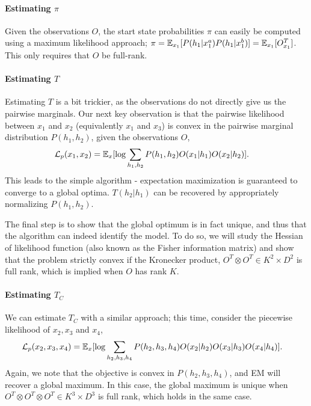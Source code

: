 \paragraph{Estimating $\pi$}

Given the observations $O$, the start state probabilities $\pi$ can
  easily be computed using a maximum likelihood approach; $\pi =
  \mathbb{E}_{x_1}[P(h_1|x^a_1) P(h_1|x^b_1)] = \mathbb{E}_{x_1}[O^T_{x_1}]$. This only
  requires that $O$ be full-rank.

\paragraph{Estimating $T$}

Estimating $T$ is a bit trickier, as the observations do not directly
  give us the pairwise marginals. 
Our next key observation is that the pairwise likelihood between $x_1$
  and $x_2$ (equivalently $x_1$ and $x_3$) is convex in the pairwise
  marginal distribution $P(h_1, h_2)$, given the observations $O$,
\begin{align}
  \mathcal{L}_p(x_1, x_2) &= \mathbb{E}_{x}[ \log \sum_{h_1,h_2} P(h_1, h_2) O(x_1|h_1) O(x_2|h_2)].
\end{align}
This leads to the simple algorithm - expectation maximization is
  guaranteed to converge to a global optima. $T(h_2 | h_1)$ can be
  recovered by appropriately normalizing $P(h_1, h_2)$.

The final step is to show that the global optimum is in fact unique,
  and thus that the algorithm can indeed identify the model. 
To do so, we will study the Hessian of likelihood function (also known
  as the Fisher information matrix) and show that the problem strictly
  convex if the Kronecker product, $O^T \otimes O^T \in K^2 \times D^2$ is
  full rank, which is implied when $O$ has rank $K$\verify.

\paragraph{Estimating $T_C$}

We can estimate $T_C$ with a similar approach; this time, consider the
  piecewise likelihood of $x_2, x_3$ and $x_4$, 
\begin{align}
  \mathcal{L}_p(x_2, x_3, x_4) &= \mathbb{E}_{x}[\log \sum_{h_2,h_3,h_4} P(h_2,h_3,h_4) O(x_2|h_2) O(x_3|h_3) O(x_4|h_4)].
\end{align}
Again, we note that the objective is convex in $P(h_2, h_3, h_4)$, and
  EM will recover a global maximum. 
In this case, the global maximum is unique when $O^T \otimes O^T \otimes
  O^T \in K^3 \times D^3$ is full rank, which holds in the same case.

